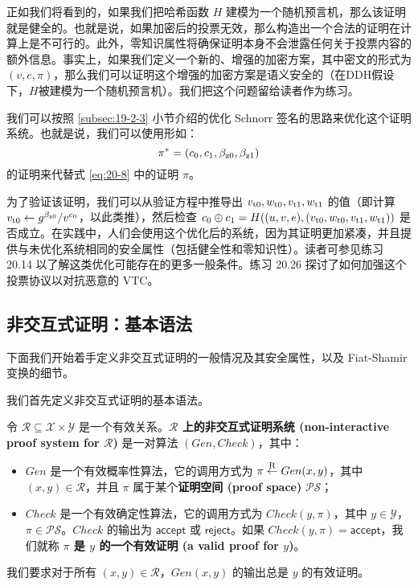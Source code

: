 正如我们将看到的，如果我们把哈希函数 $H$ 建模为一个随机预言机，那么该证明就是健全的。也就是说，如果加密后的投票无效，那么构造出一个合法的证明在计算上是不可行的。此外，零知识属性将确保证明本身不会泄露任何关于投票内容的额外信息。事实上，如果我们定义一个新的、增强的加密方案，其中密文的形式为 $(v,e,\pi)$，那么我们可以证明这个增强的加密方案是语义安全的（在DDH假设下，$H$被建模为一个随机预言机）。我们把这个问题留给读者作为练习。

我们可以按照 \ref{subsec:19-2-3} 小节介绍的优化 Schnorr 签名的思路来优化这个证明系统。也就是说，我们可以使用形如：
$$
\pi^*=(c_0,c_1,\beta_{\rm z0},\beta_{\rm z1})
$$
的证明来代替式 \ref{eq:20-8} 中的证明 $\pi$。

为了验证该证明，我们可以从验证方程中推导出 $v_{\rm t0},w_{\rm t0},v_{\rm t1},w_{\rm t1}$ 的值（即计算 $v_{\rm t0}\leftarrow{g^{\beta_{\rm z0}}}/{v^{c_0}}$，以此类推），然后检查 $c_0\oplus c_1=H((u,v,e),(v_{\rm t0},w_{\rm t0},v_{\rm t1},w_{\rm t1}))$ 是否成立。在实践中，人们会使用这个优化后的系统，因为其证明更加紧凑，并且提供与未优化系统相同的安全属性（包括健全性和零知识性）。读者可参见练习 20.14 以了解这类优化可能存在的更多一般条件。练习 20.26 探讨了如何加强这个投票协议以对抗恶意的 VTC。

\subsection{非交互式证明：基本语法}

下面我们开始着手定义非交互式证明的一般情况及其安全属性，以及 Fiat-Shamir 变换的细节。

我们首先定义非交互式证明的基本语法。

\begin{definition}[非交互式证明系统]
令 $\mathcal{R}\subseteq\mathcal{X}\times\mathcal{Y}$ 是一个有效关系。\textbf{$\mathcal R$ 上的非交互式证明系统 (non-interactive proof system for $\mathcal{R}$)} 是一对算法 $(Gen,Check)$，其中：
\begin{itemize}
	\item $Gen$ 是一个有效概率性算法，它的调用方式为 $\pi\overset{\rm R}\leftarrow Gen(x,y)$，其中 $(x, y)\in\mathcal{R}$，并且 $\pi$ 属于某个\textbf{证明空间 (proof space)} $\mathcal{PS}$；
	\item $Check$ 是一个有效确定性算法，它的调用方式为 $Check(y,\pi)$，其中 $y\in\mathcal{Y}$，$\pi\in\mathcal{PS}$。$Check$ 的输出为 $\mathsf{accept}$ 或 $\mathsf{reject}$。如果 $Check(y,\pi)=\mathsf{accept}$，我们就称 \textbf{$\pi$ 是 $y$ 的一个有效证明 (a valid proof for $y$)}。
\end{itemize}
我们要求对于所有 $(x, y)\in\mathcal{R}$，$Gen(x,y)$ 的输出总是 $y$ 的有效证明。
\end{definition}

